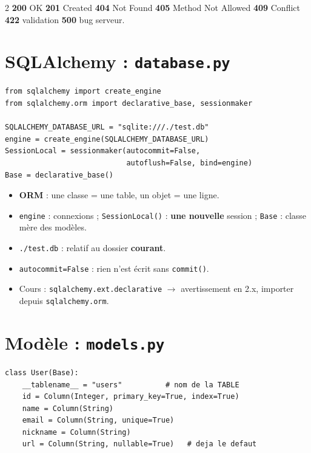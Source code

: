 \documentclass[a4paper,10pt]{article}
\newcommand{\co}[1]{\texttt{\textcolor{codefg}{#1}}}
\begin{document}
\begin{multicols}{2}
\vspace{0.3em}
\textbf{200} OK \quad \textbf{201} Created \quad \textbf{404} Not Found
\quad \textbf{405} Method Not Allowed \quad \textbf{409} Conflict \quad
\textbf{422} validation \quad \textbf{500} bug serveur.

\section{SQLAlchemy : \co{database.py}}

\begin{lstlisting}
from sqlalchemy import create_engine
from sqlalchemy.orm import declarative_base, sessionmaker

SQLALCHEMY_DATABASE_URL = "sqlite:///./test.db"
engine = create_engine(SQLALCHEMY_DATABASE_URL)
SessionLocal = sessionmaker(autocommit=False,
                            autoflush=False, bind=engine)
Base = declarative_base()
\end{lstlisting}

\begin{itemize}
  \item \textbf{ORM} : une classe = une table, un objet = une ligne.
  \item \co{engine} : connexions ; \co{SessionLocal()} : \textbf{une
        nouvelle} session ; \co{Base} : classe mère des modèles.
  \item \co{./test.db} : relatif au dossier \textbf{courant}.
  \item \co{autocommit=False} : rien n'est écrit sans \co{commit()}.
  \item Cours : \co{sqlalchemy.ext.declarative} $\to$ avertissement en 2.x,
        importer depuis \co{sqlalchemy.orm}.
\end{itemize}

\section{Modèle : \co{models.py}}

\begin{lstlisting}
class User(Base):
    __tablename__ = "users"          # nom de la TABLE
    id = Column(Integer, primary_key=True, index=True)
    name = Column(String)
    email = Column(String, unique=True)
    nickname = Column(String)
    url = Column(String, nullable=True)   # deja le defaut


\end{lstlisting}
\end{multicols}
\end{document}

